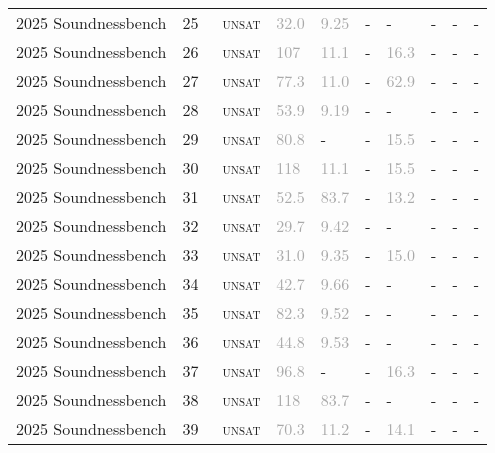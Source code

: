 \begin{center}
{\begin{longtable}{@{}llllllllll@{}}
2025 Soundnessbench & 25 & ~\textsc{unsat} & \textcolor{darkgray}{32.0} & \textcolor{darkgray}{9.25} & - & - & - & - & - \\
2025 Soundnessbench & 26 & ~\textsc{unsat} & \textcolor{darkgray}{107} & \textcolor{darkgray}{11.1} & - & \textcolor{darkgray}{16.3} & - & - & - \\
2025 Soundnessbench & 27 & ~\textsc{unsat} & \textcolor{darkgray}{77.3} & \textcolor{darkgray}{11.0} & - & \textcolor{darkgray}{62.9} & - & - & - \\
2025 Soundnessbench & 28 & ~\textsc{unsat} & \textcolor{darkgray}{53.9} & \textcolor{darkgray}{9.19} & - & - & - & - & - \\
2025 Soundnessbench & 29 & ~\textsc{unsat} & \textcolor{darkgray}{80.8} & - & - & \textcolor{darkgray}{15.5} & - & - & - \\
2025 Soundnessbench & 30 & ~\textsc{unsat} & \textcolor{darkgray}{118} & \textcolor{darkgray}{11.1} & - & \textcolor{darkgray}{15.5} & - & - & - \\
2025 Soundnessbench & 31 & ~\textsc{unsat} & \textcolor{darkgray}{52.5} & \textcolor{darkgray}{83.7} & - & \textcolor{darkgray}{13.2} & - & - & - \\
2025 Soundnessbench & 32 & ~\textsc{unsat} & \textcolor{darkgray}{29.7} & \textcolor{darkgray}{9.42} & - & - & - & - & - \\
2025 Soundnessbench & 33 & ~\textsc{unsat} & \textcolor{darkgray}{31.0} & \textcolor{darkgray}{9.35} & - & \textcolor{darkgray}{15.0} & - & - & - \\
2025 Soundnessbench & 34 & ~\textsc{unsat} & \textcolor{darkgray}{42.7} & \textcolor{darkgray}{9.66} & - & - & - & - & - \\
2025 Soundnessbench & 35 & ~\textsc{unsat} & \textcolor{darkgray}{82.3} & \textcolor{darkgray}{9.52} & - & - & - & - & - \\
2025 Soundnessbench & 36 & ~\textsc{unsat} & \textcolor{darkgray}{44.8} & \textcolor{darkgray}{9.53} & - & - & - & - & - \\
2025 Soundnessbench & 37 & ~\textsc{unsat} & \textcolor{darkgray}{96.8} & - & - & \textcolor{darkgray}{16.3} & - & - & - \\
2025 Soundnessbench & 38 & ~\textsc{unsat} & \textcolor{darkgray}{118} & \textcolor{darkgray}{83.7} & - & - & - & - & - \\
2025 Soundnessbench & 39 & ~\textsc{unsat} & \textcolor{darkgray}{70.3} & \textcolor{darkgray}{11.2} & - & \textcolor{darkgray}{14.1} & - & - & - \\

\end{longtable}}
\end{center}
